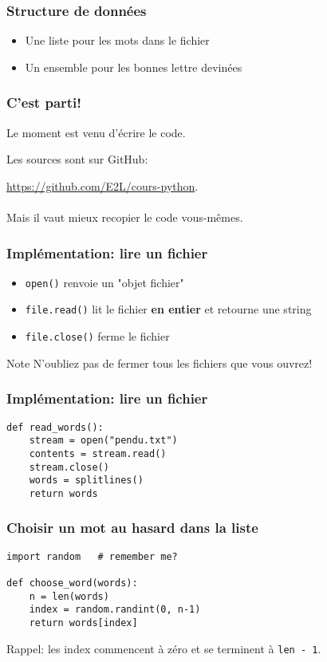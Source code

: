 \documentclass{beamer}
\begin{document}
\begin{frame}[fragile]
  \frametitle{Structure de données}
\begin{itemize}
  \item Une liste pour les mots dans le fichier
  \item Un ensemble pour les bonnes lettre devinées
\end{itemize}
\end{frame}


\begin{frame}[fragile]
  \frametitle{C'est parti!}

Le moment est venu d'écrire le code.

Les sources sont sur GitHub:

\url{https://github.com/E2L/cours-python}. \\~\\

Mais il vaut mieux recopier le code vous-mêmes.

\end{frame}


\begin{frame}[fragile]
  \frametitle{Implémentation: lire un fichier}

\begin{itemize}
  \item \texttt{open()} renvoie un "objet fichier"
  \item \texttt{file.read()} lit le fichier \textbf{en entier} et retourne une string
  \item \texttt{file.close()} ferme le fichier
\end{itemize}

\begin{alertblock}{Note}
  N'oubliez pas de fermer tous les fichiers que vous ouvrez!
\end{alertblock}
\end{frame}

\begin{frame}[fragile]
  \frametitle{Implémentation: lire un fichier}

\begin{lstlisting}
def read_words():
    stream = open("pendu.txt")
    contents = stream.read()
    stream.close()
    words = splitlines()
    return words
\end{lstlisting}

\end{frame}

\begin{frame}[fragile]
  \frametitle{Choisir un mot au hasard dans la liste}
\begin{lstlisting}
import random   # remember me?

def choose_word(words):
    n = len(words)
    index = random.randint(0, n-1)
    return words[index]
\end{lstlisting}

Rappel: les index commencent à zéro et se terminent à \texttt{len - 1}.

\end{frame}
\end{document}
